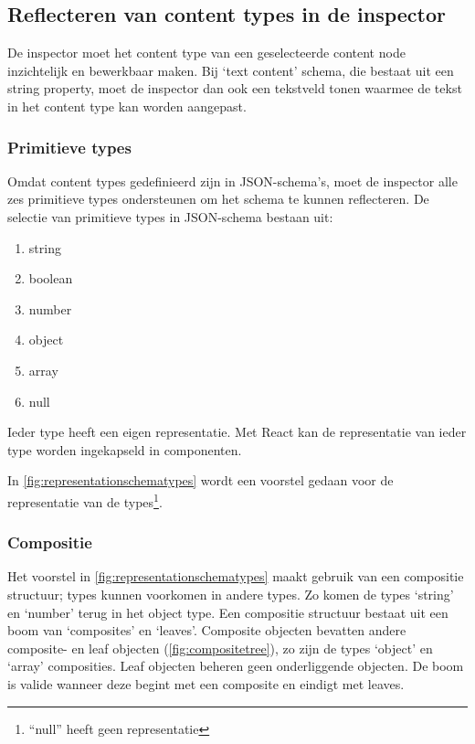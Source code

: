 \pagebreak
\subsection{Reflecteren van content types in de inspector}
De inspector moet het content type van een geselecteerde content node inzichtelijk en bewerkbaar maken. Bij ‘text content’ schema, die bestaat uit een string property, moet de inspector dan ook een tekstveld tonen waarmee de tekst in het content type kan worden aangepast.
\subsubsection{Primitieve types}
Omdat content types gedefinieerd zijn in JSON-schema’s, moet de inspector alle zes primitieve types\cite{Droettboom2016} ondersteunen om het schema te kunnen reflecteren. De selectie van primitieve types in JSON-schema bestaan uit:

\begin{enumerate}
    \item string
    \item boolean
    \item number
    \item object
    \item array
    \item null
\end{enumerate}

\noindent Ieder type heeft een eigen representatie. Met React kan de representatie van ieder type worden ingekapseld in componenten.

In \autoref{fig:representationschematypes} wordt een voorstel gedaan voor de representatie van de types\footnote{“null” heeft geen representatie}.

\subsubsection{Compositie}
Het voorstel in \autoref{fig:representationschematypes} maakt gebruik van een compositie structuur; types kunnen voorkomen in andere types. Zo komen de types ‘string’ en ‘number’ terug in het object type. Een compositie structuur bestaat uit een boom van ‘composites’ en ‘leaves’. Composite objecten bevatten andere composite- en leaf objecten (\autoref{fig:compositetree}), zo zijn de types ‘object’ en ‘array’ composities. Leaf objecten beheren geen onderliggende objecten. De boom is valide wanneer deze begint met een composite en eindigt met leaves.

